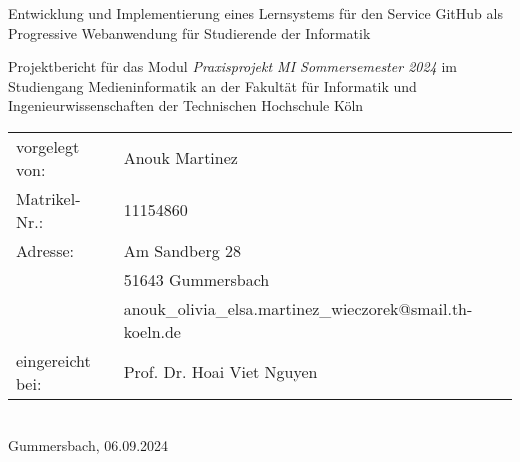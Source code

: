 \begin{titlepage}
%
\sffamily%
%
\begin{center}
\end{center}
%
\vfill
%
\begin{huge}
Entwicklung und Implementierung eines Lernsystems für den Service GitHub als Progressive Webanwendung für Studierende der Informatik\\[10mm]
\end{huge}
%
Projektbericht für das Modul\newline
\emph{Praxisprojekt MI Sommersemester 2024}\newline
im Studiengang Medieninformatik\newline
an der Fakultät für Informatik und Ingenieurwissenschaften\newline
der Technischen Hochschule Köln
%
\vfill
%
\begin{tabular}{@{}ll}
vorgelegt von: & Anouk Martinez\\
Matrikel-Nr.:  & 11154860\\
Adresse:       & Am Sandberg 28\\
               & 51643 Gummersbach\\
               & anouk\_olivia\_elsa.martinez\_wieczorek@smail.th-koeln.de\\[5mm]
eingereicht bei:   & Prof. Dr. Hoai Viet Nguyen\\
\end{tabular}	
%
\\[10mm]
%
Gummersbach, 06.09.2024%
%
\rmfamily%
%
\end{titlepage}